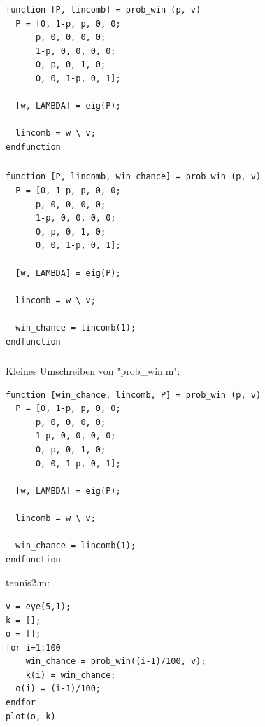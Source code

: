 \documentclass{article}
\begin{document}
\subsubsection{}
\begin{lstlisting}
function [P, lincomb] = prob_win (p, v)
  P = [0, 1-p, p, 0, 0;
      p, 0, 0, 0, 0;
      1-p, 0, 0, 0, 0;
      0, p, 0, 1, 0;
      0, 0, 1-p, 0, 1];
  
  [w, LAMBDA] = eig(P);
  
  lincomb = w \ v;
endfunction
\end{lstlisting}

\subsubsection{}
\begin{lstlisting}
function [P, lincomb, win_chance] = prob_win (p, v)
  P = [0, 1-p, p, 0, 0;
      p, 0, 0, 0, 0;
      1-p, 0, 0, 0, 0;
      0, p, 0, 1, 0;
      0, 0, 1-p, 0, 1];
  
  [w, LAMBDA] = eig(P);
  
  lincomb = w \ v;
  
  win_chance = lincomb(1);
endfunction
\end{lstlisting}

\subsubsection{}
Kleines Umschreiben von "prob\_win.m": \\
\begin{lstlisting}
function [win_chance, lincomb, P] = prob_win (p, v)
  P = [0, 1-p, p, 0, 0;
      p, 0, 0, 0, 0;
      1-p, 0, 0, 0, 0;
      0, p, 0, 1, 0;
      0, 0, 1-p, 0, 1];
  
  [w, LAMBDA] = eig(P);
  
  lincomb = w \ v;
  
  win_chance = lincomb(1);
endfunction
\end{lstlisting}

tennis2.m: \\
\begin{lstlisting}
v = eye(5,1);
k = [];
o = [];
for i=1:100
	win_chance = prob_win((i-1)/100, v);
	k(i) = win_chance;
  o(i) = (i-1)/100;
endfor
plot(o, k)
\end{lstlisting}
\end{document}
